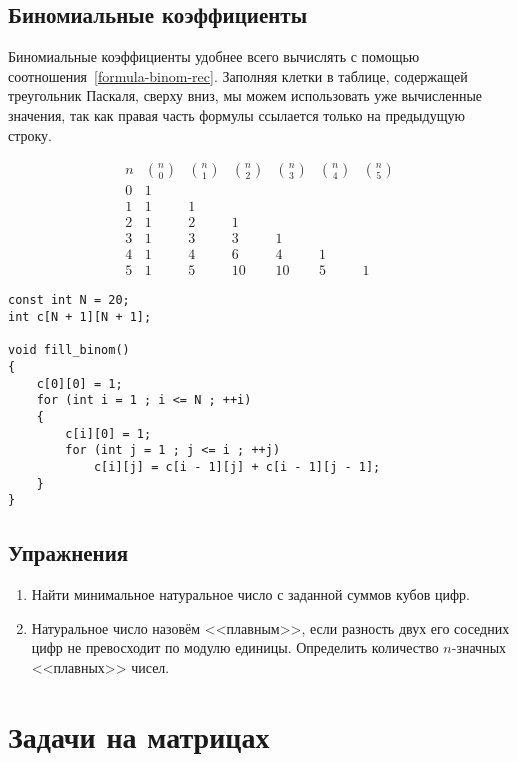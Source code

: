 \documentclass[14pt,openany]{book}
\begin{document}
\section{Биномиальные коэффициенты}

Биномиальные коэффициенты удобнее всего вычислять с помощью соотношения~\ref{formula-binom-rec}.
Заполняя клетки в таблице, содержащей треугольник Паскаля, сверху вниз, мы можем
использовать уже вычисленные значения, так как правая часть формулы ссылается только на
предыдущую строку.

$$
 \begin{array}{ccccccc}
 n & \binom{n}{0} & \binom{n}{1} & \binom{n}{2} & \binom{n}{3} & \binom{n}{4} & \binom{n}{5} \\
 0 & 1 \\
 1 & 1 & 1 \\
 2 &  1 & 2 & 1 \\
 3 & 1 & 3 & 3 & 1 \\
 4 & 1 & 4 & 6 & 4 & 1 \\
 5 & 1 & 5 & 10 & 10 & 5 & 1
 \end{array}
$$

\begin{lstlisting}
const int N = 20;
int c[N + 1][N + 1];

void fill_binom()
{
    c[0][0] = 1;
    for (int i = 1 ; i <= N ; ++i)
    {
        c[i][0] = 1;
        for (int j = 1 ; j <= i ; ++j)
            c[i][j] = c[i - 1][j] + c[i - 1][j - 1];
    }
}
\end{lstlisting}

\section{Упражнения}

\begin{enumerate}

\item Найти минимальное натуральное число с заданной суммов кубов цифр.

\item Натуральное число назовём <<плавным>>, если разность двух его соседних цифр не превосходит
      по модулю единицы. Определить количество $n$-значных <<плавных>> чисел.

\end{enumerate}

\chapter{Задачи на матрицах}
\end{document}
